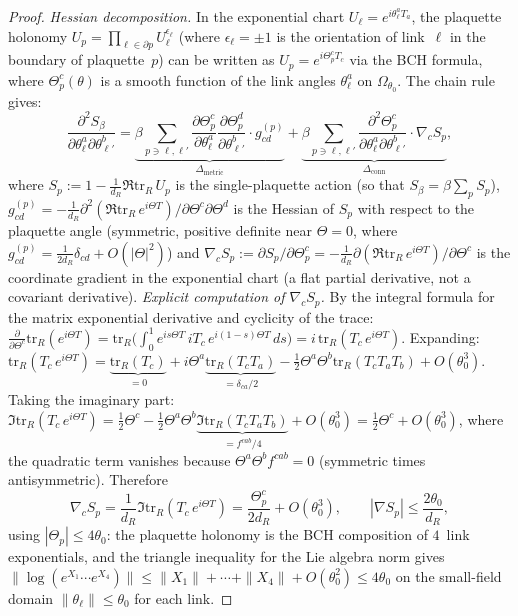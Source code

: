 \documentclass[11pt]{article}
\theoremstyle{definition}
\newcommand{\tr}{\mathrm{tr}}
\begin{document}
\begin{proof}
\emph{Hessian decomposition.}
In the exponential chart $U_\ell=e^{i\theta_\ell^a T_a}$,
the plaquette holonomy $U_p=\prod_{\ell\in\partial p}
U_\ell^{\epsilon_\ell}$ (where $\epsilon_\ell=\pm 1$
is the orientation of link~$\ell$ in the boundary of
plaquette~$p$) can be written as
$U_p=e^{i\Theta_p^c T_c}$ via the BCH formula,
where $\Theta_p^c(\theta)$ is a smooth function
of the link angles $\theta_\ell^a$ on $\Omega_{\theta_0}$.
The chain rule gives:
\begin{equation}\label{sun-eq:hessian-decomp}
\frac{\partial^2 S_\beta}{\partial\theta_\ell^a
\partial\theta_{\ell'}^b}
=\underbrace{
\beta\sum_{p\ni\ell,\ell'}\frac{\partial\Theta_p^c}
{\partial\theta_\ell^a}\frac{\partial\Theta_p^d}
{\partial\theta_{\ell'}^b}\cdot g^{(p)}_{cd}
}_{\displaystyle\Delta_{\text{metric}}}
+\underbrace{
\beta\sum_{p\ni\ell,\ell'}\frac{\partial^2\Theta_p^c}
{\partial\theta_\ell^a\partial\theta_{\ell'}^b}
\cdot\nabla_c S_p
}_{\displaystyle\Delta_{\text{conn}}},
\end{equation}
where $S_p:=1-\frac{1}{d_R}\Re\tr_R\,U_p$ is the
single-plaquette action (so that $S_\beta=\beta\sum_p S_p$),
$g^{(p)}_{cd}
=-\frac{1}{d_R}\partial^2(\Re\tr_R\,e^{i\Theta T})
/\partial\Theta^c\partial\Theta^d$ is the Hessian
of $S_p$ with respect to the plaquette angle
(symmetric, positive
definite near $\Theta=0$, where
$g^{(p)}_{cd}=\frac{1}{2d_R}\delta_{cd}+O(|\Theta|^2)$)
and
$\nabla_c S_p
:=\partial S_p/\partial\Theta_p^c
=-\frac{1}{d_R}\partial(\Re\tr_R\,e^{i\Theta T})
/\partial\Theta^c$ is the coordinate gradient in the
exponential chart (a flat partial derivative, not a
covariant derivative).
\emph{Explicit computation of $\nabla_c S_p$.}
By the integral formula for the matrix exponential
derivative and cyclicity of the trace:
$\frac{\partial}{\partial\Theta^c}\tr_R(e^{i\Theta T})
=\tr_R\bigl(\int_0^1 e^{is\Theta T}\,iT_c\,
e^{i(1-s)\Theta T}\,ds\bigr)
=i\,\tr_R(T_c\,e^{i\Theta T})$.
Expanding:
$\tr_R(T_c\,e^{i\Theta T})
=\underbrace{\tr_R(T_c)}_{=0}
+i\Theta^a\underbrace{\tr_R(T_c T_a)}_{=\delta_{ca}/2}
-\tfrac{1}{2}\Theta^a\Theta^b\tr_R(T_c T_a T_b)
+O(\theta_0^3)$.
Taking the imaginary part:
$\Im\tr_R(T_c\,e^{i\Theta T})
=\tfrac{1}{2}\Theta^c
-\tfrac{1}{2}\Theta^a\Theta^b
\underbrace{\Im\tr_R(T_c T_a T_b)}_{=f^{cab}/4}
+O(\theta_0^3)
=\tfrac{1}{2}\Theta^c+O(\theta_0^3)$,
where the quadratic term vanishes because
$\Theta^a\Theta^b f^{cab}=0$ (symmetric times
antisymmetric).  Therefore
\begin{equation}\label{sun-eq:grad-Sp}
\nabla_c S_p=\frac{1}{d_R}\Im\tr_R(T_c\,e^{i\Theta T})
=\frac{\Theta_p^c}{2d_R}+O(\theta_0^3),
\qquad
|\nabla S_p|\le\frac{2\theta_0}{d_R},
\end{equation}
using $|\Theta_p|\le 4\theta_0$: the plaquette holonomy
is the BCH composition of $4$~link exponentials, and
the triangle inequality for the Lie algebra norm gives
$\|\log(e^{X_1}\cdots e^{X_4})\|
\le\|X_1\|+\cdots+\|X_4\|+O(\theta_0^2)
\le 4\theta_0$ on the small-field domain
$\|\theta_\ell\|\le\theta_0$ for each link.


\end{proof}
\end{document}
